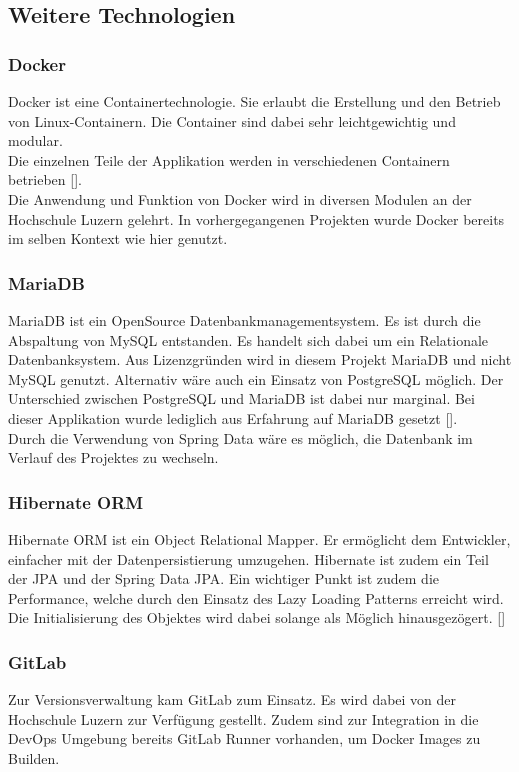 \subsection{Weitere Technologien}
\subsubsection{Docker}
Docker ist eine Containertechnologie. Sie erlaubt die Erstellung und den Betrieb von Linux-Containern. Die Container sind dabei sehr leichtgewichtig und modular.\\
Die einzelnen Teile der Applikation werden in verschiedenen Containern betrieben [\cite{docker}].\\
Die Anwendung und Funktion von Docker wird in diversen Modulen an der Hochschule Luzern gelehrt. In vorhergegangenen Projekten wurde Docker bereits im selben Kontext wie hier genutzt. 

\subsubsection{MariaDB}
MariaDB ist ein OpenSource Datenbankmanagementsystem. Es ist durch die Abspaltung von MySQL entstanden. Es handelt sich dabei um ein Relationale Datenbanksystem. 
Aus Lizenzgründen wird in diesem Projekt MariaDB und nicht MySQL genutzt. Alternativ wäre auch ein Einsatz von PostgreSQL möglich. Der Unterschied zwischen PostgreSQL und MariaDB ist dabei nur marginal. Bei dieser Applikation wurde lediglich aus Erfahrung auf MariaDB gesetzt [\cite{mariadbVsPostgresql}]. \\
Durch die Verwendung von Spring Data wäre es möglich, die Datenbank im Verlauf des Projektes zu wechseln. 

\subsubsection{Hibernate ORM}
Hibernate ORM ist ein Object Relational Mapper. 
Er ermöglicht dem Entwickler, einfacher mit der Datenpersistierung umzugehen. Hibernate ist zudem ein Teil der \ac{JPA} und der Spring Data JPA. 
Ein wichtiger Punkt ist zudem die Performance, welche durch den Einsatz des Lazy Loading Patterns erreicht wird. Die Initialisierung des Objektes wird dabei solange als Möglich hinausgezögert. [\cite{hibernateORM}]

\subsubsection{GitLab}
Zur Versionsverwaltung kam GitLab zum Einsatz. Es wird dabei von der Hochschule Luzern zur Verfügung gestellt. Zudem sind zur Integration in die DevOps Umgebung bereits GitLab Runner vorhanden, um Docker Images zu Builden. 

